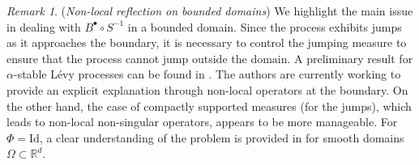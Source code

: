 \documentclass[11pt,a4paper]{article}
\theoremstyle{plain}
\theoremstyle{definition}
\theoremstyle{remark}
\newtheorem{remark}{Remark}
\begin{document}
		\begin{remark}
			({\it Non-local reflection on bounded domains}) We highlight the main issue in dealing with \( B^\bullet \circ S^{-1} \) in a bounded domain. Since the process exhibits jumps as it approaches the boundary, it is necessary to control the jumping measure to ensure that the process cannot jump outside the domain. A preliminary result for \(\alpha\)-stable L\'{e}vy processes can be found in \cite{Bogdan}. The authors are currently working to provide an explicit explanation through non-local operators at the boundary. On the other hand, the case of compactly supported measures (for the jumps), which leads to non-local non-singular operators, appears to be more manageable. For \( \Phi = \text{Id} \), a clear understanding of the problem is provided in \cite{d2022fractionalsticky} for smooth domains \( \Omega \subset \mathbb{R}^d \).
		\end{remark}
		
		
\end{document}

